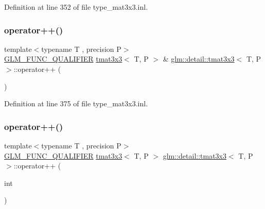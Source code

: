 Definition at line 352 of file type\+\_\+mat3x3.\+inl.

\mbox{\label{structglm_1_1detail_1_1tmat3x3_aba962e910e7a5e3de57b14c4215ec471}} 
\subsubsection{\texorpdfstring{operator++()}{operator++()}\hspace{0.1cm}{\footnotesize\ttfamily [1/2]}}
{\footnotesize\ttfamily template$<$typename T , precision P$>$ \\
\hyperlink{setup_8hpp_a33fdea6f91c5f834105f7415e2a64407}{G\+L\+M\+\_\+\+F\+U\+N\+C\+\_\+\+Q\+U\+A\+L\+I\+F\+I\+ER} \hyperlink{structglm_1_1detail_1_1tmat3x3}{tmat3x3}$<$ T, P $>$ \& \hyperlink{structglm_1_1detail_1_1tmat3x3}{glm\+::detail\+::tmat3x3}$<$ T, P $>$\+::operator++ (\begin{DoxyParamCaption}{ }\end{DoxyParamCaption})}



Definition at line 375 of file type\+\_\+mat3x3.\+inl.

\mbox{\label{structglm_1_1detail_1_1tmat3x3_a42b606493a76f7246e3c4b6a0e10b064}} 
\subsubsection{\texorpdfstring{operator++()}{operator++()}\hspace{0.1cm}{\footnotesize\ttfamily [2/2]}}
{\footnotesize\ttfamily template$<$typename T , precision P$>$ \\
\hyperlink{setup_8hpp_a33fdea6f91c5f834105f7415e2a64407}{G\+L\+M\+\_\+\+F\+U\+N\+C\+\_\+\+Q\+U\+A\+L\+I\+F\+I\+ER} \hyperlink{structglm_1_1detail_1_1tmat3x3}{tmat3x3}$<$ T, P $>$ \hyperlink{structglm_1_1detail_1_1tmat3x3}{glm\+::detail\+::tmat3x3}$<$ T, P $>$\+::operator++ (\begin{DoxyParamCaption}\item[{int}]{ }\end{DoxyParamCaption})}



